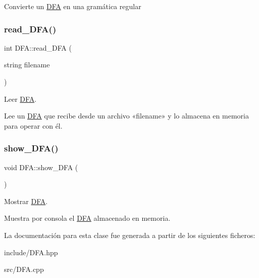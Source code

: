 Convierte un \mbox{\hyperlink{class_d_f_a}{D\+FA}} en una gramática regular \mbox{\label{class_d_f_a_a835c3e271e3cfa828be10d92a7d8dca8}} 
\subsubsection{\texorpdfstring{read\+\_\+\+D\+F\+A()}{read\_DFA()}}
{\footnotesize\ttfamily int D\+F\+A\+::read\+\_\+\+D\+FA (\begin{DoxyParamCaption}\item[{string}]{filename }\end{DoxyParamCaption})}



Leer \mbox{\hyperlink{class_d_f_a}{D\+FA}}. 

Lee un \mbox{\hyperlink{class_d_f_a}{D\+FA}} que recibe desde un archivo «filename» y lo almacena en memoria para operar con él. \mbox{\label{class_d_f_a_a3523d9fd18d415c21e36d8269ab534dd}} 
\subsubsection{\texorpdfstring{show\+\_\+\+D\+F\+A()}{show\_DFA()}}
{\footnotesize\ttfamily void D\+F\+A\+::show\+\_\+\+D\+FA (\begin{DoxyParamCaption}{ }\end{DoxyParamCaption})}



Mostrar \mbox{\hyperlink{class_d_f_a}{D\+FA}}. 

Muestra por consola el \mbox{\hyperlink{class_d_f_a}{D\+FA}} almacenado en memoria. 

La documentación para esta clase fue generada a partir de los siguientes ficheros\+:\begin{DoxyCompactItemize}
\item 
include/D\+F\+A.\+hpp\item 
src/D\+F\+A.\+cpp\end{DoxyCompactItemize}
